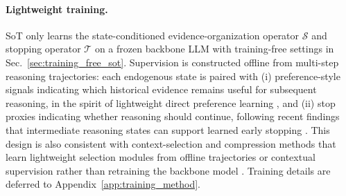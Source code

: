 \paragraph{Lightweight training.}
SoT only learns the state-conditioned evidence-organization operator \(\mathcal{S}\) and stopping operator \(\mathcal{T}\) on a frozen backbone LLM with training-free settings in Sec.~\ref{sec:training_free_sot}. 
Supervision is constructed offline from multi-step reasoning trajectories: each endogenous state is paired with (i) preference-style signals indicating which historical evidence remains useful for subsequent reasoning, in the spirit of lightweight direct preference learning \citep{hong2024orpo,rafailov2023direct}, and (ii) stop proxies indicating whether reasoning should continue, following recent findings that intermediate reasoning states can support learned early stopping \citep{liu2025answer}. 
This design is also consistent with context-selection and compression methods that learn lightweight selection modules from offline trajectories or contextual supervision rather than retraining the backbone model \citep{jiang2024longllmlingua,li2023compressing}.
Training details are deferred to Appendix~\ref{app:training_method}.
